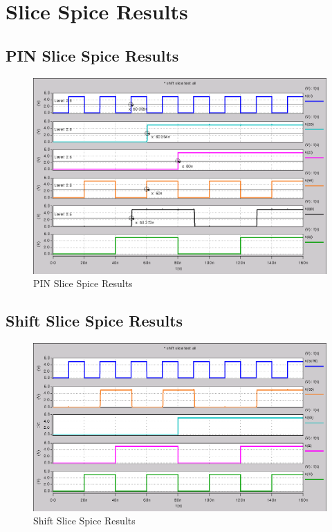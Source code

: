 \newpage
\section{Slice Spice Results}

    \subsection{PIN Slice Spice Results}
        
        \begin{figure}[H]
            \centering
            \includegraphics[width=0.75\linewidth]{../../spice/pin_slice_all_annotated.png}
            \caption{PIN Slice Spice Results}
        \end{figure}

    \newpage
    \subsection{Shift Slice Spice Results}
        
        \begin{figure}[H]
            \centering
            \includegraphics[width=0.75\linewidth]{../../spice/shift_slice_all.png}
            \caption{Shift Slice Spice Results}
        \end{figure}

